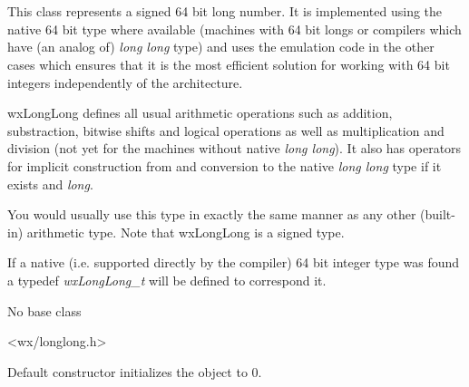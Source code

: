 
\section{}\label{wxlonglong}

This class represents a signed 64 bit long number. It is implemented using the
native 64 bit type where available (machines with 64 bit longs or compilers
which have (an analog of) {\it long long} type) and uses the emulation code in
the other cases which ensures that it is the most efficient solution for
working with 64 bit integers independently of the architecture.

wxLongLong defines all usual arithmetic operations such as addition,
substraction, bitwise shifts and logical operations as well as multiplication
and division (not yet for the machines without native {\it long long}). It
also has operators for implicit construction from and conversion to the native 
{\it long long} type if it exists and {\it long}.

You would usually use this type in exactly the same manner as any other
(built-in) arithmetic type. Note that wxLongLong is a signed type.

If a native (i.e. supported directly by the compiler) 64 bit integer type was
found a typedef {\it wxLongLong\_t} will be defined to correspond it.


No base class


<wx/longlong.h>


\label{wxlonglongwxlonglongdef}


Default constructor initializes the object to 0.

\label{wxlonglongwxlonglongll}


